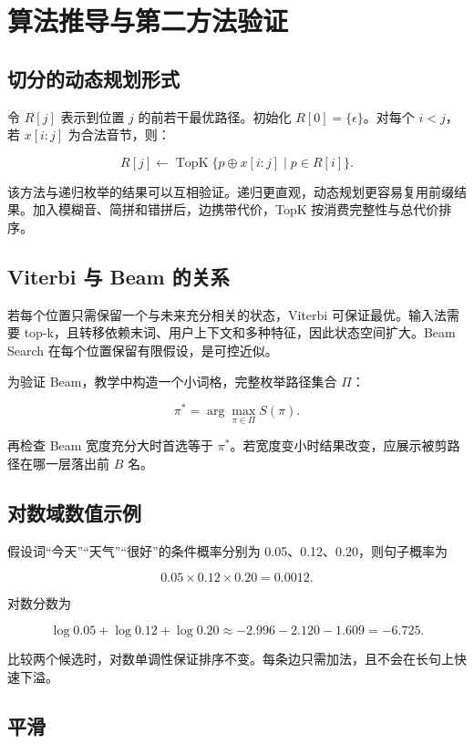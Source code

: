 \chapter{算法推导与第二方法验证}

\section{切分的动态规划形式}

令 \(R[j]\) 表示到位置 \(j\) 的前若干最优路径。初始化 \(R[0]=\{\epsilon\}\)。对每个 \(i<j\)，若 \(x[i:j]\) 为合法音节，则：

\[
R[j]\leftarrow \operatorname{TopK}\{p\oplus x[i:j]\mid p\in R[i]\}.
\]

该方法与递归枚举的结果可以互相验证。递归更直观，动态规划更容易复用前缀结果。加入模糊音、简拼和错拼后，边携带代价，TopK 按消费完整性与总代价排序。

\section{Viterbi 与 Beam 的关系}

若每个位置只需保留一个与未来充分相关的状态，Viterbi 可保证最优。输入法需要 top-k，且转移依赖末词、用户上下文和多种特征，因此状态空间扩大。Beam Search 在每个位置保留有限假设，是可控近似。

为验证 Beam，教学中构造一个小词格，完整枚举路径集合 \(\Pi\)：

\[
\pi^*=\arg\max_{\pi\in\Pi}S(\pi).
\]

再检查 Beam 宽度充分大时首选等于 \(\pi^*\)。若宽度变小时结果改变，应展示被剪路径在哪一层落出前 \(B\) 名。

\section{对数域数值示例}

假设词“今天”“天气”“很好”的条件概率分别为 0.05、0.12、0.20，则句子概率为

\[
0.05\times0.12\times0.20=0.0012.
\]

对数分数为

\[
\log0.05+\log0.12+\log0.20\approx-2.996-2.120-1.609=-6.725.
\]

比较两个候选时，对数单调性保证排序不变。每条边只需加法，且不会在长句上快速下溢。

\section{平滑}

